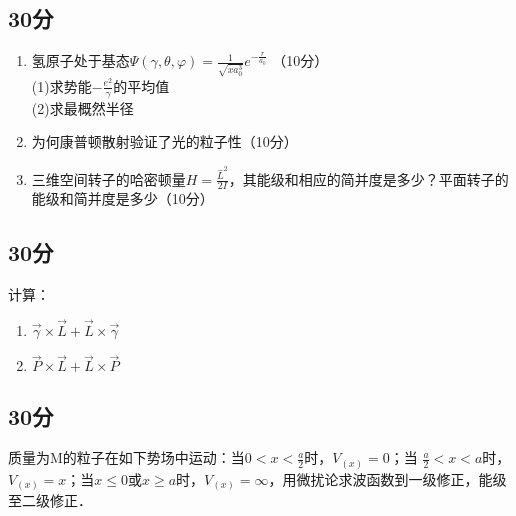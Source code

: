 
\subsection{30分}
\begin{enumerate}
\item 氢原子处于基态$\varPsi(\gamma,\theta,\varphi)=\frac{1}{\sqrt{xa^{3}_{0}}}e^{-\frac{r}{a_0}}$ （10分）\\
(1)求势能$-\frac{e^2}{\gamma}$的平均值\\
(2)求最概然半径\\
\item 为何康普顿散射验证了光的粒子性（10分）\\
\item 三维空间转子的哈密顿量$H=\frac{\hat{L}^2}{2I}$，其能级和相应的简并度是多少？平面转子的能级和简并度是多少（10分）\\
\end{enumerate}
\subsection{30分}
计算：\\
\begin{enumerate}
\item $\vec{\gamma}\times \vec{L}+ \vec{L}\times \vec{\gamma}$
\item $\vec{P}\times\vec{L}+\vec{L}\times\vec{P}$
\end{enumerate}
\subsection{30分}
质量为M的粒子在如下势场中运动：当$0<x<\frac{a}{2}$时，$V_{(x)}=0$；当 $\frac{a}{2} <x<a$时，$V_{(x)}=x$；当$x \le 0$或$x \ge a$时，$V_{(x)}=\infty$，用微扰论求波函数到一级修正，能级至二级修正．